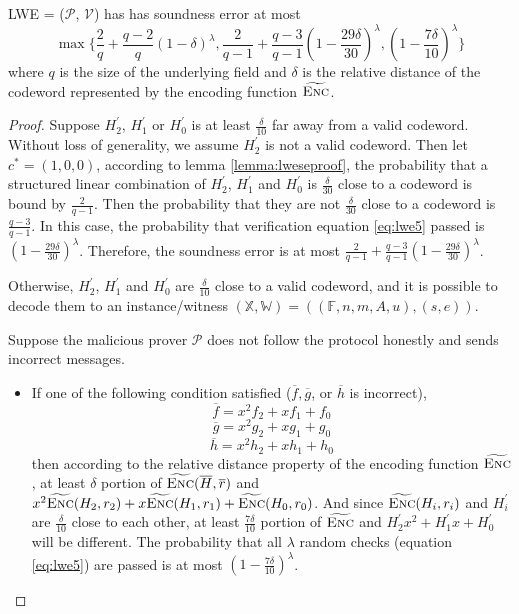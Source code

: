 \begin{lemma}
\label{lemma:lwese}

LWE = ($\mathcal{P}$, $\mathcal{V}$) has has soundness error at most 
$$
    \max
    \biggl\{
    \frac{2}{q} + \frac{q-2}{q}(1 - \delta)^\lambda, 
    \frac{2}{q-1} + \frac{q-3}{q-1}(1 - \frac{29\delta}{30})^\lambda,
    (1 - \frac{7\delta}{10})^\lambda
    \biggr\}
$$
where $q$ is the size of the underlying field and $\delta$ is the relative distance of the codeword represented by the encoding function $\widetilde{\textsc{Enc}}$.

\end{lemma}
\begin{proof}

Suppose $H_2^\prime$, $H_1^\prime$ or $H_0^\prime$ is at least $\frac{\delta}{10}$ far away from a valid codeword. Without loss of generality, we assume $H_2^\prime$ is not a valid codeword. Then let $c^* = (1, 0, 0)$, according to lemma \ref{lemma:lweseproof}, the probability that a structured linear combination of $H_2^\prime$, $H_1^\prime$ and $H_0^\prime$ is $\frac{\delta}{30}$ close to a codeword is bound by $\frac{2}{q-1}$. Then the probability that they are not $\frac{\delta}{30}$ close to a codeword is $\frac{q-3}{q-1}$. In this case, the probability that verification equation \ref{eq:lwe5} passed is $(1 - \frac{29\delta}{30})^\lambda$. Therefore, the soundness error is at most $\frac{2}{q-1} + \frac{q-3}{q-1}(1 - \frac{29\delta}{30})^\lambda$.

Otherwise, $H_2^\prime$, $H_1^\prime$ and $H_0^\prime$ are $\frac{\delta}{10}$ close to a valid codeword, and it is possible to decode them to an instance/witness $(\mathbb{X}, \mathbb{W}) = ((\mathbb{F}, n, m, A, u), (s, e))$. 

Suppose the malicious prover $\mathcal{P}$ does not follow the protocol honestly and sends incorrect messages. 
\begin{itemize}

    \item If one of the following condition satisfied ($\overline{f}, \overline{g}$, or $\overline{h}$ is incorrect),
    $$\overline{f} = x^2f_2 + xf_1 + f_0$$
    $$\overline{g} = x^2g_2 + xg_1 + g_0$$
    $$\overline{h} = x^2h_2 + xh_1 + h_0$$
    then according to the relative distance property of the encoding function $\widetilde{\textsc{Enc}}$, 
    at least $\delta$ portion of $\widetilde{\textsc{Enc}}(\overline{H}, \overline{r})$ and
    $x^2\widetilde{\textsc{Enc}}(H_2, r_2) + x\widetilde{\textsc{Enc}}(H_1, r_1) + \widetilde{\textsc{Enc}}(H_0, r_0)$.
    And since $\widetilde{\textsc{Enc}}(H_i, r_i)$ and $H_i^\prime$ are $\frac{\delta}{10}$ close to each other, at least $\frac{7\delta}{10}$ portion of $\widetilde{\textsc{Enc}}$ and 
    $H_2^\prime x^2 + H_1^\prime x + H_0^\prime$ will be different. The probability that all $\lambda$ random checks (equation \ref{eq:lwe5}) are passed is at most $(1 - \frac{7\delta}{10})^\lambda$.
    

\end{itemize}
\end{proof}
